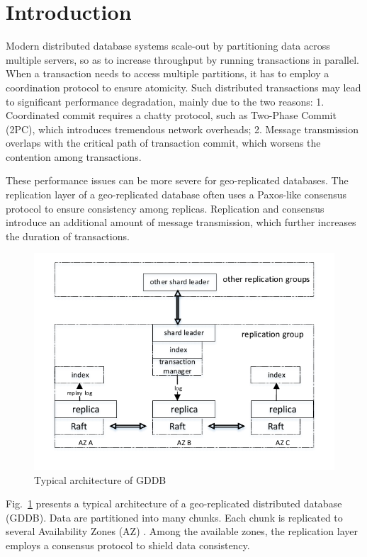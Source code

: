 \documentclass[conference]{IEEEtran}
\begin{document}
\section{Introduction}

Modern distributed database systems scale-out by partitioning data across multiple servers,
so as to increase throughput by running transactions in parallel.
When a transaction needs to access multiple partitions, it has to employ a coordination protocol to ensure atomicity.
Such distributed transactions may lead to significant performance degradation, mainly due to the two reasons\cite{Calvin:conf/sigmod/ThomsonDWRSA12}:
1. Coordinated commit requires a chatty protocol, such as Two-Phase Commit (2PC), which introduces tremendous network overheads;
2. Message transmission overlaps with the critical path of transaction commit, which worsens the contention among transactions.

These performance issues can be more severe for geo-replicated databases.
The replication layer of a geo-replicated database often uses a Paxos-like consensus protocol to ensure consistency among replicas.
Replication and consensus introduce an additional amount of message transmission, which further increases the duration of transactions.


\begin{figure}[tbp]
  \centerline{\includegraphics[scale=0.7]{figure/architecture.pdf}}
  \caption{Typical architecture of GDDB}
  \label{fig:architecture}
\end{figure}

Fig.~\ref{fig:architecture} presents a typical architecture of a geo-replicated distributed database (GDDB).
Data are partitioned into many chunks.
Each chunk is replicated to several Availability Zones (AZ) \cite{Aurora:conf/sigmod/VerbitskiGSCGBM18}.
Among the available zones, the replication layer employs a consensus protocol to shield data consistency.
\end{document}
